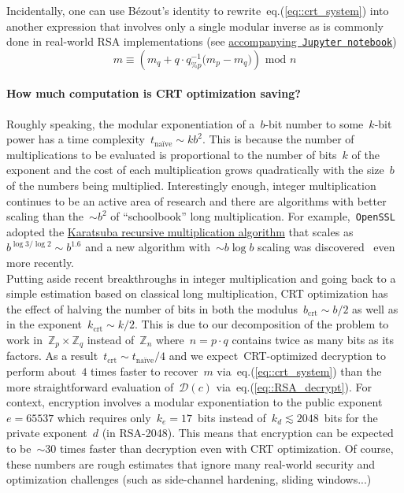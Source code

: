 \documentclass{article}
\begin{document}
\noindent Incidentally, one can use B\'ezout's identity to rewrite~eq.(\ref{eq::crt_system}) into another expression that involves only a single modular inverse as is commonly done in real-world RSA implementations (see \href{https://github.com/Ranlot/public-key-encryption}{accompanying~\texttt{Jupyter notebook}})
\begin{equation*}
m \equiv \left( m_q + q \cdot q^{-1}_{\%p} \big( m_p - m_q \big) \right) \,\,\text{mod}\,\, n
\end{equation*}

\paragraph{How much computation is CRT optimization saving?} Roughly speaking, the modular exponentiation of a~$b$-bit number to some~$k$-bit power has a time complexity~$t_\text{na\"ive} \sim k b^2$.  This is because the number of multiplications to be evaluated is proportional to the number of bits~$k$ of the exponent and the cost of each multiplication grows quadratically with the size~$b$ of the numbers being multiplied.  Interestingly enough, integer multiplication continues to be an active area of research and there are algorithms with better scaling than the~$\sim b^2$ of ``schoolbook'' long multiplication.  For example,~\texttt{OpenSSL} adopted the \href{https://en.wikipedia.org/wiki/Karatsuba_algorithm}{Karatsuba recursive multiplication algorithm} that scales as~$b^{\log 3 / \log 2} \sim b^{1.6}$ and a new algorithm with~$\sim b\log b$ scaling was discovered~\cite{Harvey} even more recently. \\

\noindent Putting aside recent breakthroughs in integer multiplication and going back to a simple estimation based on classical long multiplication, CRT optimization has the effect of halving the number of bits in both the modulus~$b_\text{crt} \sim b/2$ as well as in the exponent~$k_\text{crt} \sim k /2$.  This is due to our decomposition of the problem to work in~$\mathbb{Z}_p \times \mathbb{Z}_q$ instead of~$\mathbb{Z}_n$ where~$n = p \cdot q$ contains twice as many bits as its factors.  As a result~$t_\text{crt} \sim t_\text{na\"ive} / 4$ and we expect~CRT-optimized decryption to perform about~$4$ times faster to recover~$m$ via~eq.(\ref{eq::crt_system}) than the more straightforward evaluation of~$\mathcal{D}(c)$ via~eq.(\ref{eq::RSA_decrypt}).  For context, encryption involves a modular exponentiation to the public exponent~$e = 65537$ which requires only~$k_e=17$~bits instead of~$k_d \lesssim 2048$~bits for the private exponent~$d$ (in RSA-2048).  This means that encryption can be expected to be~$\sim 30$ times faster than decryption even with CRT optimization.  Of course, these numbers are rough estimates that ignore many real-world security and optimization challenges (such as side-channel hardening, sliding windows...)
\end{document}

